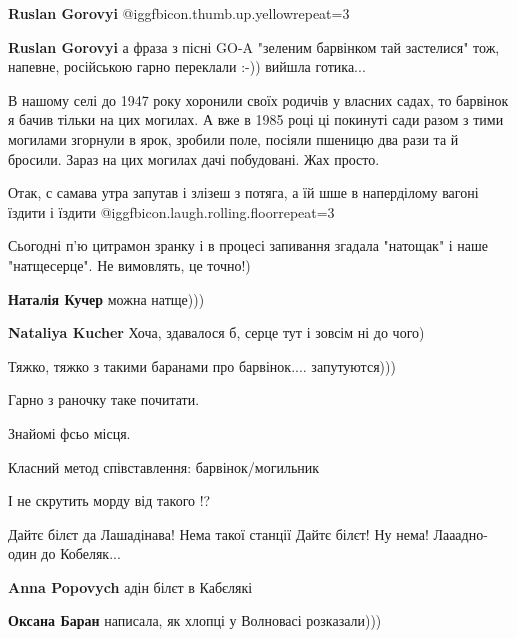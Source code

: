\begin{itemize}
\begin{itemize}
\textbf{Ruslan Gorovyi}  @igg{fbicon.thumb.up.yellow}{repeat=3} 

\textbf{Ruslan Gorovyi} а фраза з пісні GO-A "зеленим барвінком тай застелися" тож, напевне, російською гарно переклали :-)) вийшла готика...


В нашому селі до 1947 року хоронили своїх родичів у власних садах, то барвінок
я бачив тільки на цих могилах. А вже в 1985 році ці покинуті сади разом з тими
могилами згорнули в ярок, зробили поле, посіяли пшеницю два рази та й
бросили. Зараз на цих могилах дачі побудовані. Жах просто.

\end{itemize} %


Отак, с самава утра запутав і злізеш з потяга, а їй шше в наперділому вагоні
їздити і їздити @igg{fbicon.laugh.rolling.floor}{repeat=3} 


Сьогодні п'ю цитрамон зранку і в процесі запивання згадала "натощак" і наше
"натщесерце". Не вимовлять, це точно!)

\begin{itemize} %
\textbf{Наталія Кучер} можна натще)))

\textbf{Nataliya Kucher}
Хоча, здавалося б, серце тут і зовсім ні до чого)
\end{itemize} %

Тяжко, тяжко з такими баранами про барвінок.... запутуются)))

Гарно з раночку таке почитати.

Знайомі фсьо місця.

Класний метод співставлення: барвінок/могильник

І не скрутить морду від такого !?

Дайтє білєт да Лашадінава!
Нема такої станції
Дайтє білєт!
Ну нема!
Лааадно- один до Кобеляк...

\begin{itemize} %
\textbf{Anna Popovych} адін білєт в Кабєлякі

\textbf{Оксана Баран} написала, як хлопці у Волновасі розказали)))


\end{itemize}
\end{itemize}
